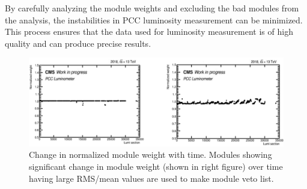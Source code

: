 
By carefully analyzing the module weights and excluding the bad modules from the analysis, the instabilities in PCC luminosity measurement can be minimized. This process ensures that the data used for luminosity measurement is of high quality and can produce precise results.




\begin{figure}[!htp]
\centering
\includegraphics[width=1\textwidth]{ashish_thesis/good_bad_modules_1.png}
\caption[Good/Bad Module Weights]{%
   Change in normalized module weight with time. Modules showing significant change in module weight (shown in right figure) over time having large RMS/mean values are used to make module veto list.
}
\label{fig:goodbadmodules}
\end{figure}

